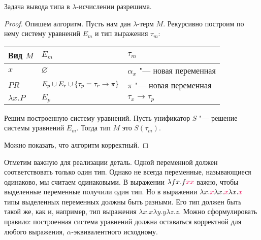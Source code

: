 \begin{theorem}
    Задача вывода типа в $\lambda$-исчислении разрешима.
\end{theorem}

\begin{proof}
    Опишем алгоритм. Пусть нам дан $\lambda$-терм $M$. Рекурсивно построим по нему систему уравнений $E_m$ и тип выражения $\tau_m$:
    \begin{center}
    \begin{tabular}{l l l} \toprule
        Вид $M$         & $E_m$                                                 & $\tau_m$                         \\ \midrule
        $x$             & $\varnothing$                                         & $\alpha_x$ "--- новая переменная \\ \midrule
        $PR$            & $E_p \cup E_r \cup \left\{\tau_p=\tau_r\to\pi\right\}$ & $\pi$ "--- новая переменная      \\ \midrule
        $\lambda x . P$ & $E_p$                                                 & $\tau_x\to\tau_p$        \\ \bottomrule
    \end{tabular}
    \end{center}
    Решим построенную систему уравнений.
    Пусть унификатор $S$ "--- решение системы уравнений $E_m$. Тогда тип $M$ это $S(\tau_m)$.

    Можно показать, что алгоритм корректный.
\end{proof}

Отметим важную для реализации деталь. Одной переменной должен соответствовать только один тип.
Однако не всегда переменные, называющиеся одинаково, мы считаем одинаковыми.
В выражении $\lambda f x . f \reduction x \reduction x$ важно, чтобы выделенные переменные получили один тип.
Но в выражении $\lambda x . \reduction x \lambda x . \reduction x \lambda x . \reduction x$ типы выделенных переменных должны быть разными.
Его тип должен быть такой же, как и, например, тип выражения $\lambda x . x \lambda y . y \lambda z . z$.
Можно сформулировать правило: построенная система уравнений должна оставаться корректной для любого выражения,
$\alpha$-эквивалентного исходному.

